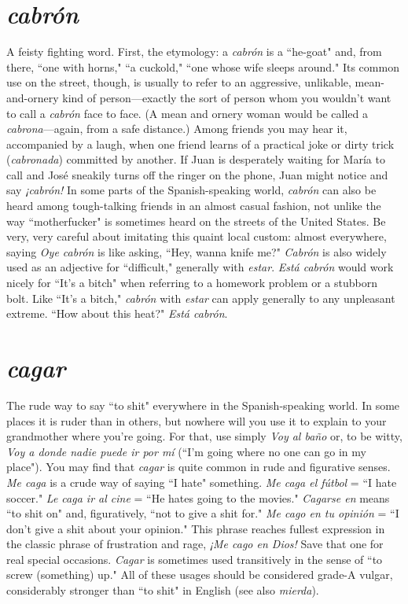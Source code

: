 \section{\emph{cabrón}}

A feisty fighting word. First, the etymology: a \emph{cabrón} is a ``he-goat" and, from there, ``one with horns," ``a cuckold," ``one whose wife
sleeps around." Its common use on the street, though, is usually to
refer to an aggressive, unlikable, mean-and-ornery kind of person---exactly the sort of person whom you wouldn't want to call a \emph{cabrón}
face to face. (A mean and ornery woman would be called a \emph{cabrona}---again, from a safe distance.) Among friends you may hear it, accompanied by a laugh, when one friend learns of a practical joke or dirty trick
(\emph{cabronada}) committed by another. If Juan is desperately waiting for
María to call and José sneakily turns off the ringer on the phone, Juan
might notice and say \emph{¡cabrón!} In some parts of the Spanish-speaking
world, \emph{cabrón} can also be heard among tough-talking friends in an almost casual fashion, not unlike the way ``motherfucker" is sometimes
heard on the streets of the United States. Be very, very careful about
imitating this quaint local custom: almost everywhere, saying \emph{Oye cabrón} is like asking, ``Hey, wanna knife me?" \emph{Cabrón} is also widely
used as an adjective for ``difficult," generally with \emph{estar}. \emph{Está cabrón}
would work nicely for ``It's a bitch" when referring to a homework
problem or a stubborn bolt. Like ``It's a bitch," \emph{cabrón} with \emph{estar} can
apply generally to any unpleasant extreme. ``How about this heat?"
\emph{Está cabrón}.

\section{\emph{cagar}}

The rude way to say ``to shit" everywhere in the Spanish-speaking world. In some places it is ruder than in others, but nowhere
will you use it to explain to your grandmother where you're going. For
that, use simply \emph{Voy al baño} or, to be witty, \emph{Voy a donde nadie puede
	ir por mí} (``I'm going where no one can go in my place").
You may find that \emph{cagar} is quite common in rude and figurative senses. \emph{Me caga} is a crude way of saying ``I hate" something. \emph{Me
	caga el fútbol} = ``I hate soccer." \emph{Le caga ir al cine} = ``He hates going
to the movies." \emph{Cagarse en} means ``to shit on" and, figuratively, ``not
to give a shit for." \emph{Me cago en tu opinión} = ``I don't give a shit about
your opinion." This phrase reaches fullest expression in the classic
phrase of frustration and rage, \emph{¡Me cago en Dios!} Save that one for real
special occasions. \emph{Cagar} is sometimes used transitively in the sense of
``to screw (something) up." All of these usages should be considered
grade-A vulgar, considerably stronger than ``to shit" in English (see
also \emph{mierda}).

